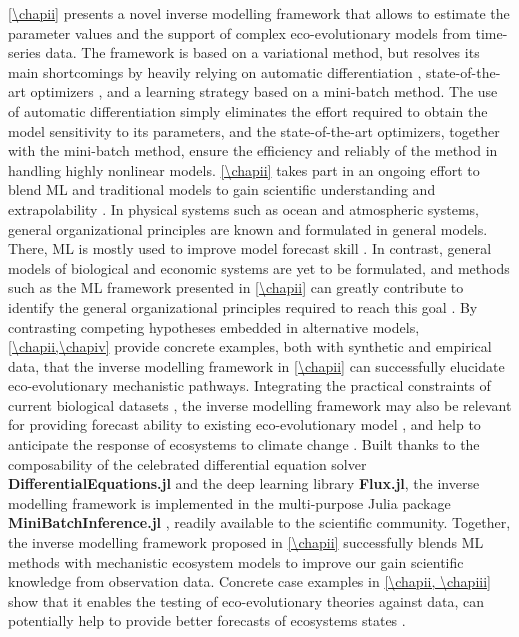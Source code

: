 %
\cref{\chapii} presents a novel inverse modelling framework that allows to estimate the parameter values and the support of complex eco-evolutionary models from time-series data.
% 
The framework is based on a variational method, but resolves its main shortcomings by heavily relying on automatic differentiation \citep{Rackauckas2020a}, state-of-the-art optimizers \citep{Kingma2014}, and a learning strategy based on a mini-batch method. 
% 
The use of automatic differentiation simply eliminates the effort required to obtain the model sensitivity to its parameters, and the state-of-the-art optimizers, together with the mini-batch method, ensure the efficiency and reliably of the method in handling highly nonlinear models.
% 
\cref{\chapii} takes part in an ongoing effort to blend ML and traditional models to gain scientific understanding and extrapolability \citep{Karpatne2017,Rackauckas2020a,Schneider2017,Rolnick2023,Kashinath2021,Yazdani2020,Raissi2019}. 
% 
In physical systems such as ocean and atmospheric systems, general organizational principles are known and formulated in general models. There, ML is mostly used to improve model forecast skill \citep{Schneider2017}. In contrast, general models of biological and economic systems are yet to be formulated, and methods such as the ML framework presented in \cref{\chapii} can greatly contribute to identify the general organizational principles required to reach this goal \citep{Karpatne2017}. 
% 
By contrasting competing hypotheses embedded in alternative models, \cref{\chapii,\chapiv} provide concrete examples, both with synthetic and empirical data, that the inverse modelling framework in \cref{\chapii} can successfully elucidate eco-evolutionary mechanistic pathways.
Integrating the practical constraints of current biological datasets \citep{Dornelas2018}, the inverse modelling framework may also be relevant for providing forecast ability to existing eco-evolutionary model \citep{Norberg2012}, and help to anticipate the response of ecosystems to climate change \citep{Urban2016}.
% 
Built thanks to the composability of the celebrated differential equation solver \textbf{DifferentialEquations.jl} and the deep learning library \textbf{Flux.jl}, the inverse modelling framework is implemented in the multi-purpose Julia package \textbf{MiniBatchInference.jl} \citep{MiniBatchInference}, readily available to the scientific community. %
% 
Together, the inverse modelling framework proposed in \cref{\chapii} successfully blends ML methods with mechanistic ecosystem models to improve our gain scientific knowledge from observation data. Concrete case examples in \cref{\chapii, \chapiii} show that it enables the testing of eco-evolutionary theories against data, can potentially help to provide better forecasts of ecosystems states \citep{Urban2016}.


